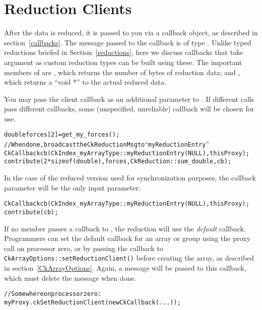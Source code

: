 \section{Reduction Clients}

\label{reductionClients}

After the data is reduced, it is passed to you via a callback object,
as described in section~\ref{callbacks}.  The message passed to
the callback is of type . Unlike typed reductions
briefed in Section~\ref{reductions}, here we discuss callbacks that take 
 argument as custom reduction types can be built using these.
The important members of  are
, which returns the number of bytes of reduction data; and
, which returns a ``void *'' to the actual reduced data.

You may pass the client callback as an additional parameter to .
If different  calls pass different callbacks, some (unspecified,
unreliable) callback will be chosen for use.
\begin{alltt}
    double forces[2]=get_my_forces();
    // When done, broadcast the CkReductionMsg to ``myReductionEntry''
    CkCallback cb(CkIndex_myArrayType::myReductionEntry(NULL), thisProxy);
    contribute(2*sizeof(double), forces,CkReduction::sum_double, cb);
\end{alltt}

In the case of the reduced version used for synchronization purposes, the
callback parameter will be the only input parameter:
\begin{alltt}
    CkCallback cb(CkIndex_myArrayType::myReductionEntry(NULL), thisProxy);
    contribute(cb);
\end{alltt}

If no member passes a callback to , the reduction will use
the {\em default} callback. Programmers can set the default callback for an array or group
using the  proxy call on processor zero, or
by passing the callback to {\tt CkArrayOptions::setReductionClient()}
before creating the array, as described in section~\ref{CkArrayOptions}.
Again, a  message will be passed to this callback,
which must delete the message when done.

\begin{alltt}
    // Somewhere on processor zero:
    myProxy.ckSetReductionClient(new CkCallback(...));
\end{alltt}

